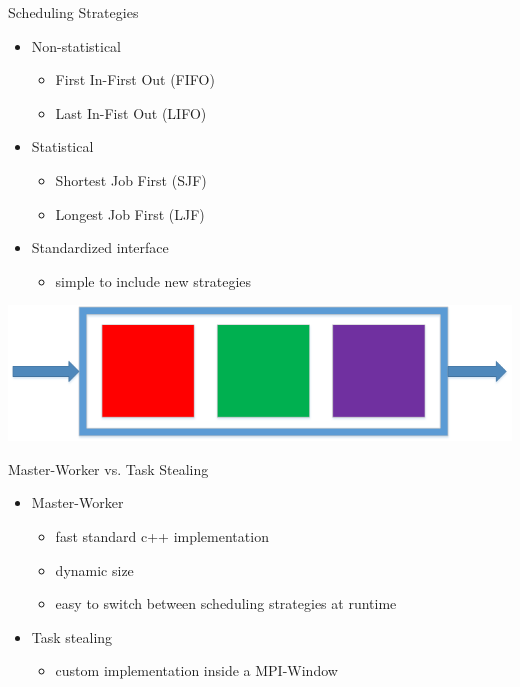	\begin{frame}{Scheduling Strategies}
	\begin{minipage}[]{.7\textwidth}%
			\begin{itemize}
		\item<2-> Non-statistical
		\begin{itemize}
			\item<3-> First In-First Out (FIFO)
			\item<4-> Last In-Fist Out (LIFO)
		\end{itemize}
		\item<5-> Statistical
		\begin{itemize}
			\item<6-> Shortest Job First (SJF)
			\item<7-> Longest Job First (LJF)
		\end{itemize}
		\item<8-> Standardized interface 
			\begin{itemize}
				\item<9-> simple to include new strategies
			\end{itemize}					
		\end{itemize}
\end{minipage}%
\begin{minipage}[]{.3\textwidth}%
  \includegraphics[width=\textwidth]{images/fifo}%
\end{minipage}		
		
	\end{frame}
	\begin{frame}{Master-Worker vs. Task Stealing}
		\begin{itemize}
			\item<2-> Master-Worker
				\begin{itemize}
					\item<3-> fast standard c++ implementation
					\item<4-> dynamic size
					\item<5-> easy to switch between scheduling strategies at runtime	
				\end{itemize}
			
			\item<6-> Task stealing
					\begin{itemize}
						\item<7-> custom implementation inside a MPI-Window
					\end{itemize}
			
		\end{itemize}
	\end{frame}